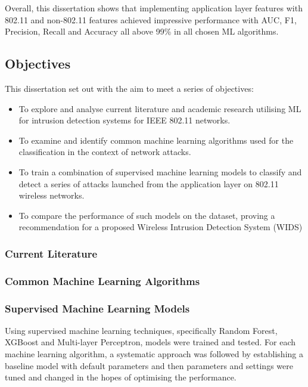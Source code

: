 Overall, this dissertation shows that implementing application layer features with 802.11 and non-802.11 features achieved impressive performance with AUC, F1, Precision, Recall and Accuracy all above 99\% in all chosen ML algorithms. 



\subsection{Objectives}


This dissertation set out with the aim to meet a series of objectives: 

\begin{itemize}
\item To explore and analyse current literature and academic research utilising ML for intrusion detection systems for IEEE 802.11 networks.
\end{itemize}
\begin{itemize}
\item To examine and identify common machine learning algorithms used for the classification in the context of network attacks.
\end{itemize}
\begin{itemize}
\item To train a combination of supervised machine learning models to classify and detect a series of attacks launched from the application layer on 802.11 wireless networks.
\item To compare the performance of such models on the dataset, proving a recommendation for a proposed Wireless Intrusion Detection System (WIDS)
\end{itemize}


\subsubsection*{Current Literature}

\subsubsection*{Common Machine Learning Algorithms}

\subsubsection*{Supervised Machine Learning Models}
Using supervised machine learning techniques, specifically Random Forest, XGBoost and Multi-layer Perceptron, models were trained and tested. For each machine learning algorithm, a systematic approach was followed by establishing a baseline model with default parameters and then parameters and settings were tuned and changed in the hopes of optimising the performance. 

